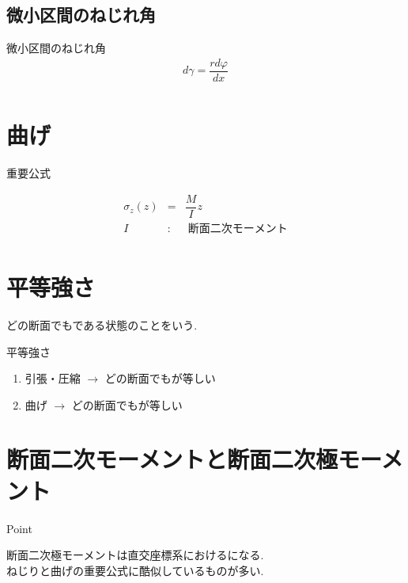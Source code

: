 \documentclass[a4paper]{jsarticle}
\begin{document}
\subsection{微小区間のねじれ角}
\begin{itembox}[l]{微小区間のねじれ角}
    \begin{eqnarray*}
        d\gamma=\dfrac{rd\varphi}{dx}\\
    \end{eqnarray*}
\end{itembox}
\section{曲げ}
\begin{itembox}[l]{重要公式}
    \begin{center}
        \begin{eqnarray*}
            \sigma_z\left(z\right)&=&\dfrac{M}{I}z\\
            I&:&\;断面二次モーメント\\
        \end{eqnarray*}
    \end{center}
\end{itembox}
\section{平等強さ}
どの断面でもである状態のことをいう.\\
\begin{itembox}[l]{平等強さ}
    \begin{enumerate}[(1)]
        \item 引張・圧縮 $\rightarrow$ どの断面でもが等しい
        \item 曲げ $\rightarrow$ どの断面でもが等しい
    \end{enumerate}
\end{itembox}
\section{断面二次モーメントと断面二次極モーメント}
\begin{itembox}[l]{Point}
    \begin{center}
        断面二次極モーメントは直交座標系におけるになる.\\
        ねじりと曲げの重要公式に酷似しているものが多い.
    \end{center}
\end{itembox}
\end{document}
